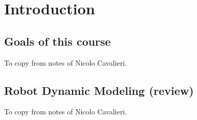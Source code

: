 


	
	
	\tableofcontents
	\clearpage
	
	\chapter{Introduction}
	\section{Goals of this course}
	To copy from notes of Nicolo Cavalieri.
	
	\section{Robot Dynamic Modeling (review)}
	To copy from notes of Nicolo Cavalieri.
	
	
	
	
	
	
	

	
